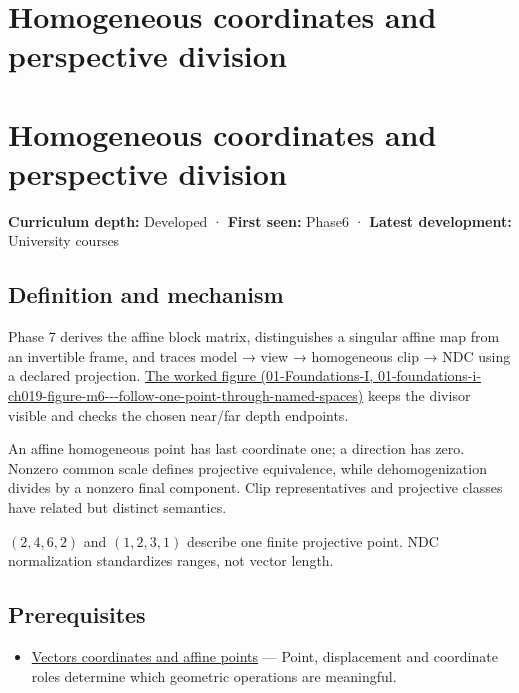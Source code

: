 \hypertarget{appendix-cb3b26862282}{}
\section*{Homogeneous coordinates and perspective division}
\section{Homogeneous coordinates and perspective division}\label{appendix-cb3b26862282-homogeneous-coordinates-and-perspective-division}

\textbf{Curriculum depth:} Developed · \textbf{First seen:} Phase6 · \textbf{Latest development:} University courses

\subsection{Definition and mechanism}\label{appendix-cb3b26862282-definition-and-mechanism}

Phase 7 derives the affine block matrix, distinguishes a singular affine map from an invertible frame, and traces model → view → homogeneous clip → NDC using a declared projection. \href{../01-Foundations-I/main.pdf\#nameddest=01-foundations-i-ch019-figure-m6---follow-one-point-through-named-spaces}{The worked figure (01-Foundations-I, 01-foundations-i-ch019-figure-m6-\/-\/-follow-one-point-through-named-spaces)} keeps the divisor visible and checks the chosen near/far depth endpoints.

An affine homogeneous point has last coordinate one; a direction has zero. Nonzero common scale defines projective equivalence, while dehomogenization divides by a nonzero final component. Clip representatives and projective classes have related but distinct semantics.

\((2,4,6,2)\) and \((1,2,3,1)\) describe one finite projective point. NDC normalization standardizes ranges, not vector length.

\subsection{Prerequisites}\label{appendix-cb3b26862282-prerequisites}

\begin{itemize}
\tightlist
\item
  \hyperref[appendix-0659864c0aa3]{Vectors coordinates and affine points} --- Point, displacement and coordinate roles determine which geometric operations are meaningful.
\end{itemize}

